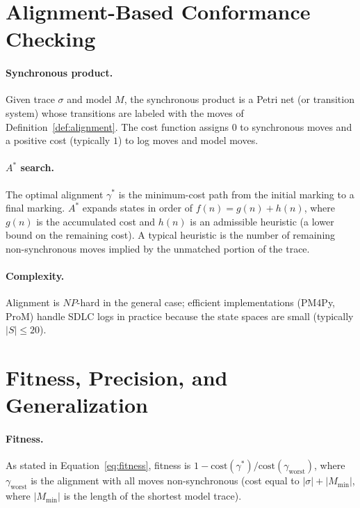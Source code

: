 \section{Alignment-Based Conformance Checking}
\label{app:C-alignment}

\paragraph{Synchronous product.} Given trace $\sigma$ and model $M$, the
synchronous product is a Petri net (or transition system) whose
transitions are labeled with the moves of Definition~\ref{def:alignment}.
The cost function assigns $0$ to synchronous moves and a positive cost
(typically $1$) to log moves and model moves.

\paragraph{$A^*$ search.} The optimal alignment $\gamma^*$ is the
minimum-cost path from the initial marking to a final marking. $A^*$
expands states in order of $f(n) = g(n) + h(n)$, where $g(n)$ is the
accumulated cost and $h(n)$ is an admissible heuristic (a lower bound on
the remaining cost). A typical heuristic is the number of remaining
non-synchronous moves implied by the unmatched portion of the trace.

\paragraph{Complexity.} Alignment is $\mathit{NP}$-hard in the general
case; efficient implementations (PM4Py, ProM) handle SDLC logs in
practice because the state spaces are small (typically $|S| \leq 20$).


\section{Fitness, Precision, and Generalization}
\label{app:C-quality}

\paragraph{Fitness.} As stated in Equation~\ref{eq:fitness}, fitness is
$1 - \mathrm{cost}(\gamma^*) / \mathrm{cost}(\gamma_{\mathrm{worst}})$,
where $\gamma_{\mathrm{worst}}$ is the alignment with all moves
non-synchronous (cost equal to $|\sigma| + |M_{\min}|$, where
$|M_{\min}|$ is the length of the shortest model trace).

